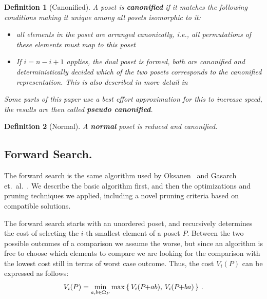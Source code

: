 \documentclass[twoside,leqno,twocolumn]{article}
\makeatletter
\newcommand\ie{i.e\@., }
\newcommand{\pchild}[3]{{#1}\kern-1pt{+}{#2}{#3}}
\newtheorem{definition}{Definition}[section]
\makeatother
\begin{document}

\begin{definition}[Canonified]
  A poset is \textbf{canonified} if it matches the following conditions making it unique among all posets isomorphic to it:
  \begin{itemize}
    \item all elements in the poset are arranged canonically, \ie all permutations of these elements must map to this poset
    \item
          If $i = n - i + 1$ applies, the dual poset is formed, both are canonified and deterministically decided which of the two posets corresponds to the canonified representation.
          This is also described in more detail in 
  \end{itemize}

  Some parts of this paper use a best effort approximation for this to increase speed, the results are then called \textbf{pseudo canonified}.
\end{definition}

\begin{definition}[Normal]
  A \textbf{normal} poset is reduced and canonified.
\end{definition}


\subsection{Forward Search.} \label{chapter:forward_search}
The forward search is the same algorithm used by Oksanen~\cite{Oksanen2006} and Gasarch et.\ al\@.~\cite{Gasarch1996}.
We describe the basic algorithm first, and then the optimizations and pruning techniques we applied, including a novel pruning criteria based on compatible solutions.

The forward search starts with an unordered poset, and recursively determines the cost of selecting the $i$-th smallest element of a poset $P$.
Between the two possible outcomes of a comparison we assume the worse, but since an algorithm is free to choose which elements to compare we are looking for the comparison with the lowest cost still in terms of worst case outcome.
Thus, the cost $V_i(P)$ can be expressed as follows:
\begin{equation}
  V_i(P) = \min_{a,b \in \Omega_P} \max \left\{ \,V_i(\pchild{P}{a}{b}),\, V_i(\pchild{P}{b}{a})\,\right\}\,\text{.}
\end{equation}
\end{document}
